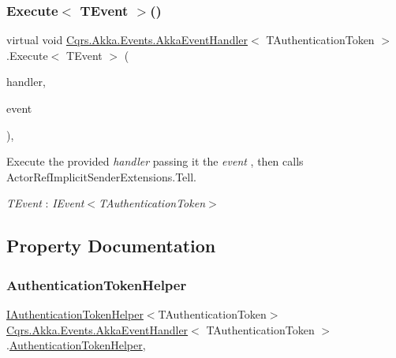 \subsubsection{\texorpdfstring{Execute$<$ T\+Event $>$()}{Execute< TEvent >()}}
{\footnotesize\ttfamily virtual void \hyperlink{classCqrs_1_1Akka_1_1Events_1_1AkkaEventHandler}{Cqrs.\+Akka.\+Events.\+Akka\+Event\+Handler}$<$ T\+Authentication\+Token $>$.Execute$<$ T\+Event $>$ (\begin{DoxyParamCaption}\item[{Action$<$ T\+Event $>$}]{handler,  }\item[{T\+Event @}]{event }\end{DoxyParamCaption})\hspace{0.3cm}{\ttfamily [protected]}, {\ttfamily [virtual]}}



Execute the provided {\itshape handler}  passing it the {\itshape event} , then calls Actor\+Ref\+Implicit\+Sender\+Extensions.\+Tell. 

\begin{Desc}
\item[Type Constraints]\begin{description}
\item[{\em T\+Event} : {\em I\+Event$<$T\+Authentication\+Token$>$}]\end{description}
\end{Desc}


\subsection{Property Documentation}
\mbox{\label{classCqrs_1_1Akka_1_1Events_1_1AkkaEventHandler_a6ab1be5352fea3cad8f8599ab31c0ab6_a6ab1be5352fea3cad8f8599ab31c0ab6}} 
\subsubsection{\texorpdfstring{Authentication\+Token\+Helper}{AuthenticationTokenHelper}}
{\footnotesize\ttfamily \hyperlink{interfaceCqrs_1_1Authentication_1_1IAuthenticationTokenHelper}{I\+Authentication\+Token\+Helper}$<$T\+Authentication\+Token$>$ \hyperlink{classCqrs_1_1Akka_1_1Events_1_1AkkaEventHandler}{Cqrs.\+Akka.\+Events.\+Akka\+Event\+Handler}$<$ T\+Authentication\+Token $>$.\hyperlink{classCqrs_1_1Authentication_1_1AuthenticationTokenHelper}{Authentication\+Token\+Helper}\hspace{0.3cm}{\ttfamily [get]}, {\ttfamily [protected]}}



